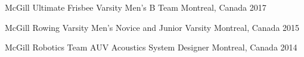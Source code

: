 



\begin{cvhonors}

  \cvhonor
    {McGill Ultimate Frisbee} %
    {Varsity Men's B Team} %
    {Montreal, Canada} %
    {2017} %

  \cvhonor
    {McGill Rowing} %
    {Varsity Men's Novice and Junior Varsity} %
    {Montreal, Canada} %
    {2015} %

  \cvhonor
    {McGill Robotics Team} %
    {AUV Acoustics System Designer} %
    {Montreal, Canada} %
    {2014} %

\end{cvhonors}
